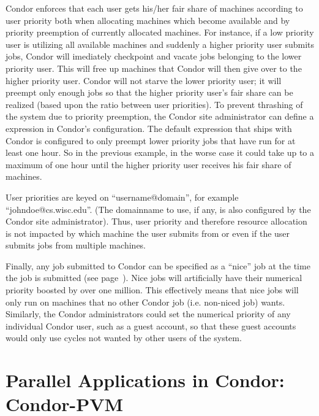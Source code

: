 Condor enforces that each user gets his/her fair share of machines
according to user priority both when allocating machines which become
available and by priority preemption of currently allocated machines.
For instance, if a low priority user is utilizing all available machines
and suddenly a higher priority user submits jobs, Condor will
imediately checkpoint and vacate jobs belonging to the lower priority
user. This will free up machines that Condor will then give over to the
higher priority user. Condor will not starve the lower priority user; it
will preempt only enough jobs so that the higher priority user's fair
share can be realized (based upon the ratio between user priorities). To
prevent thrashing of the system due to priority preemption, the Condor 
site administrator can define a  expression in Condor's configuration.
The default expression that ships with Condor is configured to only preempt 
lower priority jobs that have run
for at least one hour. So in the previous example, in the worse case it
could take up to a maximum of one hour until the higher priority user
receives his fair share of machines. 

User priorities are keyed on ``username@domain'', for example
``johndoe@cs.wisc.edu''. (The domainname to use, if any, is also configured by
the Condor site administrator).  Thus, user priority and therefore resource
allocation is not impacted by which machine the user submits from or
even if the user submits jobs from multiple machines.

Finally, any job submitted to Condor can be specified as a ``nice'' job at 
the time the job is submitted (see page~\pageref{man-condor-submit-nice}).
Nice jobs will artificially have their numerical priority boosted by
over one million. This effectively means that nice jobs will only run on
machines that no other Condor job (i.e. non-niced job) wants. Similarly,
the Condor administrators could set the numerical priority of any
individual Condor user, such as a guest account, so that these guest
accounts would only use cycles not wanted by other users of the system.


\section{Parallel Applications in Condor: Condor-PVM}
\label{sec:PVM}


